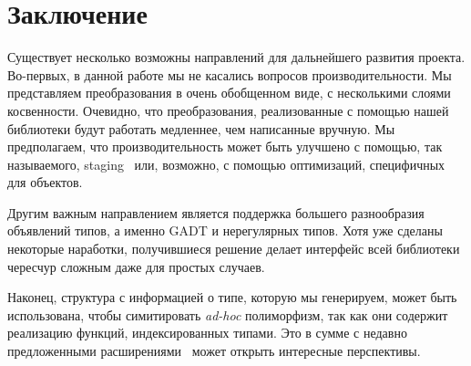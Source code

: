 \section{Заключение}
\label{sec:futurework}

Существует несколько возможны направлений для дальнейшего развития проекта. Во-первых, в данной работе мы не касались вопросов производительности. Мы представляем преобразования в очень обобщенном виде, с несколькими слоями косвенности. Очевидно, что преобразования, реализованные с помощью нашей библиотеки будут работать медленнее, чем написанные вручную. Мы предполагаем, что производительность может быть
улучшено с помощью, так называемого, staging~\cite{Staged} или, возможно, с помощью оптимизаций, специфичных для объектов.

Другим важным направлением является поддержка большего разнообразия объявлений типов, а именно GADT и нерегулярных типов. Хотя уже сделаны некоторые наработки, получившиеся решение делает интерфейс всей библиотеки чересчур сложным даже для простых случаев.

Наконец, структура с информацией о типе, которую мы генерируем, может быть использована, чтобы симитировать \emph{ad-hoc} полиморфизм, так как они содержит реализацию функций, индексированных типами. Это в сумме с недавно предложенными расширениями~\cite{ModularImplicits} может открыть интересные перспективы.

